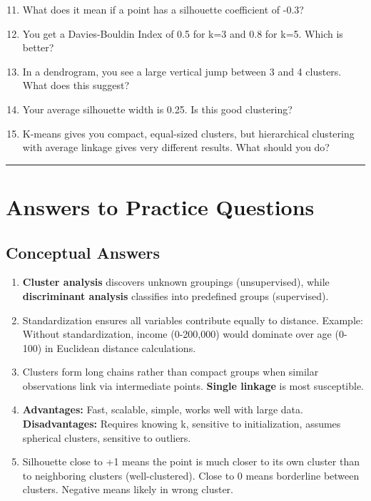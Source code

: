\documentclass[
]{article}
\begin{document}
\begin{enumerate}
\setcounter{enumi}{10}
\item
  What does it mean if a point has a silhouette coefficient of -0.3?
\item
  You get a Davies-Bouldin Index of 0.5 for k=3 and 0.8 for k=5. Which
  is better?
\item
  In a dendrogram, you see a large vertical jump between 3 and 4
  clusters. What does this suggest?
\item
  Your average silhouette width is 0.25. Is this good clustering?
\item
  K-means gives you compact, equal-sized clusters, but hierarchical
  clustering with average linkage gives very different results. What
  should you do?
\end{enumerate}

\begin{center}\rule{0.5\linewidth}{0.5pt}\end{center}

\textbf{ }

\section{Answers to Practice Questions}

\textbf{ }

\subsection{Conceptual Answers}

\begin{enumerate}
\item
  \textbf{Cluster analysis} discovers unknown groupings (unsupervised),
  while \textbf{discriminant analysis} classifies into predefined groups
  (supervised).
\item
  Standardization ensures all variables contribute equally to distance.
  Example: Without standardization, income (0-200,000) would dominate
  over age (0-100) in Euclidean distance calculations.
\item
  Clusters form long chains rather than compact groups when similar
  observations link via intermediate points. \textbf{Single linkage} is
  most susceptible.
\item
  \textbf{Advantages:} Fast, scalable, simple, works well with large
  data. \textbf{Disadvantages:} Requires knowing k, sensitive to
  initialization, assumes spherical clusters, sensitive to outliers.
\item
  Silhouette close to +1 means the point is much closer to its own
  cluster than to neighboring clusters (well-clustered). Close to 0
  means borderline between clusters. Negative means likely in wrong
  cluster.
\end{enumerate}
\end{document}
